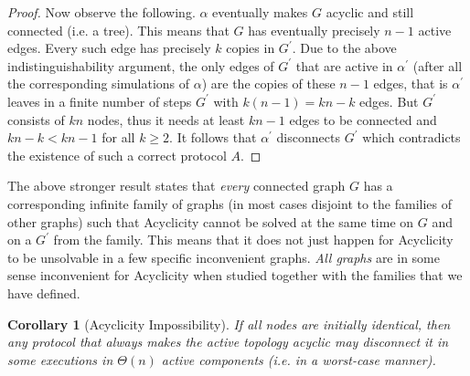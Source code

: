 \documentclass[preprint]{elsarticle}
\newtheorem{corollary}{Corollary}
\begin{document}
\begin{proof}
Now observe the following. $\alpha$ eventually makes $G$ acyclic and still
connected (i.e. a tree). This means that $G$ has eventually precisely $n-1$
active edges. Every such edge has precisely $k$ copies in $G^\prime$. Due to the
above indistinguishability argument, the only edges of $G^\prime$ that are active
in $\alpha^\prime$ (after all the corresponding simulations of $\alpha$) are the copies of
these $n-1$ edges, that is $\alpha^\prime$ leaves in a finite number of steps $G^\prime$ with
$k(n-1)=kn-k$ edges. But $G^\prime$ consists of $kn$ nodes, thus it needs at least
$kn-1$ edges to be connected and $kn-k < kn-1$ for all $k\geq 2$. It follows that
$\alpha^\prime$ disconnects $G^\prime$ which contradicts the existence of such a correct
protocol $A$.
\end{proof}

The above stronger result states that \emph{every} connected graph $G$ has a corresponding infinite family of graphs (in most cases disjoint to
the families of other graphs) such that Acyclicity cannot be solved at the same time on $G$ and on a $G^\prime$ from the family. This means that it does not just happen for Acyclicity to be unsolvable in a few specific inconvenient graphs. \emph{All graphs} are in some sense 
inconvenient for Acyclicity when studied together with the families that we have defined.

\begin{corollary} [Acyclicity Impossibility] \label{cor:acyclicity-impossibility}
If all nodes are initially identical, then any protocol that always makes the active topology acyclic may disconnect it in some executions in $\Theta(n)$ active components (i.e. in a worst-case manner).
\end{corollary}
\end{document}
